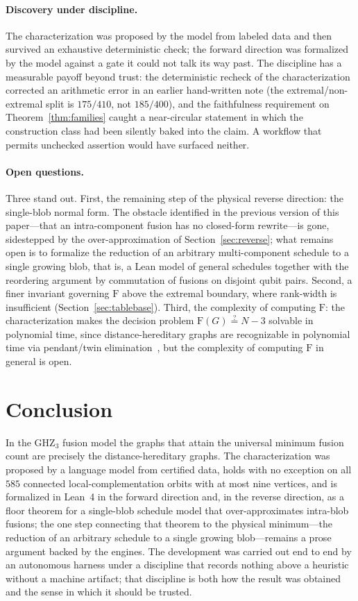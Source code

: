\documentclass[11pt]{article}
\theoremstyle{definition}
\theoremstyle{remark}
\newcommand{\F}{\mathrm{F}}
\newcommand{\GHZ}{\mathrm{GHZ}_3}
\newcommand{\N}{N}
\begin{document}
\paragraph{Discovery under discipline.} The characterization was proposed by the model from labeled
data and then survived an exhaustive deterministic check; the forward direction was formalized by
the model against a gate it could not talk its way past. The discipline has a measurable payoff
beyond trust: the deterministic recheck of the characterization corrected an arithmetic error in an
earlier hand-written note (the extremal/non-extremal split is $175/410$, not $185/400$), and the
faithfulness requirement on Theorem~\ref{thm:families} caught a near-circular statement in which
the construction class had been silently baked into the claim. A workflow that permits unchecked
assertion would have surfaced neither.

\paragraph{Open questions.} Three stand out. First, the remaining step of the physical reverse
direction: the single-blob normal form. The obstacle identified in the previous version of this
paper---that an intra-component fusion has no closed-form rewrite---is gone, sidestepped by the
over-approximation of Section~\ref{sec:reverse}; what remains open is to formalize the reduction of
an arbitrary multi-component schedule to a single growing blob, that is, a Lean model of general
schedules together with the reordering argument by commutation of fusions on disjoint qubit pairs.
Second, a finer invariant governing $\F$ above the extremal boundary, where rank-width is
insufficient (Section~\ref{sec:tablebase}). Third, the complexity of computing $\F$: the
characterization makes the decision problem $\F(G)\stackrel{?}{=}\N-3$ solvable in polynomial
time, since distance-hereditary graphs are recognizable in polynomial time via pendant/twin
elimination~\cite{bandeltmulder}, but the complexity of computing $\F$ in general is open.

\section{Conclusion}

In the $\GHZ$ fusion model the graphs that attain the universal minimum fusion count are precisely
the distance-hereditary graphs. The characterization was proposed by a language model from
certified data, holds with no exception on all $585$ connected local-complementation orbits with at
most nine vertices, and is formalized in Lean~4 in the forward direction and, in the reverse
direction, as a floor theorem for a single-blob schedule model that over-approximates intra-blob
fusions; the one step connecting that theorem to the physical minimum---the reduction of an
arbitrary schedule to a single growing blob---remains a prose argument backed by the engines. The
development was carried out end to end by an autonomous harness under a discipline that records
nothing above a heuristic without a machine artifact; that discipline is both how the result was
obtained and the sense in which it should be trusted.
\end{document}
